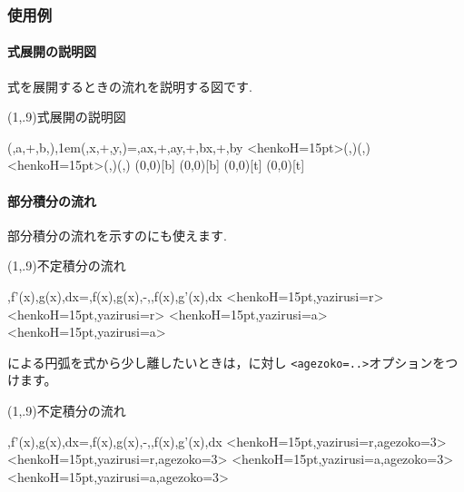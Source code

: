 \subsubsection{使用例}
\paragraph{式展開の説明図}
式を展開するときの流れを説明する図です.

\begin{showEx}(1,.9){式展開の説明図}
\vskip 24pt

\begin{sikipicture}{(,a,+,b,),\kern1em(,x,+,y,)=,ax,+,ay,+,bx,+,by}
  \HenKo<henkoH=15pt>{(\sikixposix,\ymax)}{(\sikixposii,\ymax)}{}
  \HenKo<henkoH=15pt>{(\sikixposiv,\ymin)}{(\sikixposix,\ymin)}{}
  \Put{(\sikixposxi,\ymax)}(0,0)[b]{}
  \Put{(\sikixposxiii,\ymax)}(0,0)[b]{}
  \Put{(\sikixposxv,\ymin)}(0,0)[t]{}
  \Put{(\sikixposxvii,\ymin)}(0,0)[t]{}
\end{sikipicture}
\vskip 10pt

\mbox{}
\end{showEx}

\paragraph{部分積分の流れ}
部分積分の流れを示すのにも使えます.

\begin{showEx}(1,.9){不定積分の流れ}
\vskip15pt

\begin{sikipicture}{%
  \dint{}{},f'(x),g(x),dx=,f(x),g(x),-,\dint{}{},f(x),g'(x),dx
}
  \HenKo<henkoH=15pt,yazirusi=r>\sikiTv{}
  \HenKo<henkoH=15pt,yazirusi=r>\sikiTix{}
  \HenKo<henkoH=15pt,yazirusi=a>\sikiBiii{}
  \HenKo<henkoH=15pt,yazirusi=a>\sikiBvi{}
\end{sikipicture}
\vskip10pt
\mbox{}
\end{showEx}

による円弧を式から少し離したいときは，に対し
\verb+<agezoko=..>+オプションをつけます。

\begin{showEx}(1,.9){不定積分の流れ}
\vskip18pt

\begin{sikipicture}{%
  \dint{}{},f'(x),g(x),dx=,f(x),g(x),-,\dint{}{},f(x),g'(x),dx
}
  \HenKo<henkoH=15pt,yazirusi=r,agezoko=3>\sikiTv{}
  \HenKo<henkoH=15pt,yazirusi=r,agezoko=3>\sikiTix{}
  \HenKo<henkoH=15pt,yazirusi=a,agezoko=3>\sikiBiii{}
  \HenKo<henkoH=15pt,yazirusi=a,agezoko=3>\sikiBvi{}
\end{sikipicture}
\vskip10pt
\mbox{}
\end{showEx}

